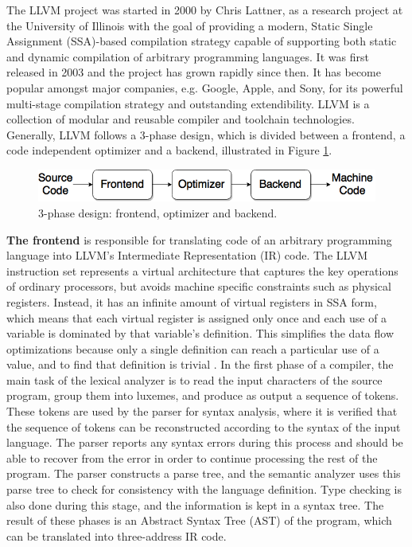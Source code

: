 The LLVM project was started in 2000 by Chris Lattner, as a research project at the University of Illinois with the goal of providing a modern, Static Single Assignment (SSA)-based compilation strategy capable of supporting both static and dynamic compilation of arbitrary programming languages. It was first released in 2003 and the project has grown rapidly since then. It has become popular amongst major companies, e.g. Google, Apple, and Sony, for its powerful multi-stage compilation strategy and outstanding extendibility. LLVM is a collection of modular and reusable compiler and toolchain technologies. Generally, LLVM follows a 3-phase design, which is divided between a frontend, a code independent optimizer and a backend, illustrated in Figure \ref{fig:3phase_design}.

\begin{figure}[H]
\centering
\includegraphics[width=.7\textwidth]{figures/3phase_design}
\caption{3-phase design: frontend, optimizer and backend.}
\label{fig:3phase_design}
\end{figure}

\textbf{The frontend} is responsible for translating code of an arbitrary programming language into LLVM's Intermediate Representation (IR) code. The LLVM instruction set represents a virtual architecture that captures the key operations of ordinary processors, but avoids machine specific constraints such as physical registers. Instead, it has an infinite amount of virtual registers in SSA form, which means that each virtual register is assigned only once and each use of a variable is dominated by that variable's definition. This simplifies the data flow optimizations because only a single definition can reach a particular use of a value, and to find that definition is trivial \cite{llvm_strategy}.
In the first phase of a compiler, the main task of the lexical analyzer is to read the input characters of the source program, group them into luxemes, and produce as output a sequence of tokens. These tokens are used by the parser for syntax analysis, where it is verified that the sequence of tokens can be reconstructed according to the syntax of the input language. The parser reports any syntax errors during this process and should be able to recover from the error in order to continue processing the rest of the program. The parser constructs a parse tree, and the semantic analyzer uses this parse tree to check for consistency with the language definition. Type checking is also done during this stage, and the information is kept in a syntax tree. The result of these phases is an Abstract Syntax Tree (AST) of the program, which can be translated into three-address IR code. %

